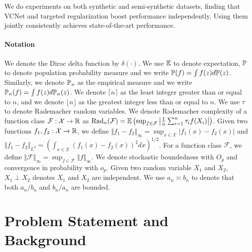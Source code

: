 \documentclass{article} %
\begin{document}
We do experiments on both synthetic and semi-synthetic datasets, finding that VCNet and targeted regularization boost performance independently. Using them jointly consistently achieves  state-of-the-art performance.



\paragraph{Notation}
We denote the Dirac delta function by $\delta(\cdot)$. We use $\E$ to denote expectation, $\P$ to denote population probability measure and we write $\P(f)=\int f(z) d\P(z)$. Similarly, we denote $\P_n$ as the empirical measure and we write $\P_n(f)=\int f(z) d\P_n(z)$. We denote $\lceil n\rceil$ as the least integer greater than or equal to $n$, and we denote $\lfloor n\rfloor$ as the greatest integer less than or equal to $n$. We use $\tau$ to denote Rademacher random variables. We denote Rademacher complexity of a function class $\mathcal{F}:\mathcal{X}\rightarrow \R$ as $\Rad(\mathcal{F})=\E\left(\sup_{f\in\mathcal{F}}\left|\frac{1}{n}\sum_{i=1}^n\tau_i f(X_i)\right|\right)$. Given two functions $f_1, f_2: \mathcal{X} \to \R$, we define $\left\Vert f_{1}-f_{2}\right\Vert _{\infty}=\sup_{x\in\mathcal{X}}\left|f_{1}(x)-f_{2}(x)\right|$ and $\left\Vert f_{1}-f_{2}\right\Vert _{L^{2}}=\left(\int_{x\in\mathcal{X}}\left(f_{1}(x)-f_{2}(x)\right)^{2}dx\right)^{1/2}$. For a function class $\mathcal{F}$, we define $\left\Vert \mathcal{F}\right\Vert _{\infty}=\sup_{f\in\mathcal{F}}\left\Vert f\right\Vert _{\infty}$. We denote stochastic boundedness with $O_p$ and convergence in probability with $o_p$. Given two random variable $X_1$ and $X_2$, $X_1 \perp X_2$ denotes $X_1$ and $X_2$ are independent. We use $a_n\asymp b_n$ to denote that both $a_n/b_n$ and $b_n/a_n$ are bounded.

\section{Problem Statement and Background}\label{sec:problem_statement}
\end{document}
